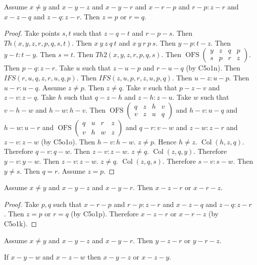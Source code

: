 \documentclass{article}
\newcommand{\Col}[3]{\operatorname{Col}(#1, #2, #3)}
\newcommand{\OFS}[8]{\operatorname{OFS}
\left(\begin{smallmatrix}%
#1 & #2 & #3 & #4 \\
#5 & #6 & #7 & #8
\end{smallmatrix}\right)%
}
\begin{document}
  \begin{forthel}
    \begin{lemma}[C5o1p]
      Assume $x \neq y$ and $x-y-z$ and $x-y-r$ and $x-r-p$ and $r-p : z-r$ and $x-z-q$ and $z-q : z-r$. Then $z = p$ or $r = q$.
    \end{lemma}
    \begin{proof}
    	Take points $s,t$ such that $z-q-t$ and $r-p-s$.
    	Then $Th(x,y,z,r,p,q,s,t)$.
    	Then $x~y~z~q~t$ and $x~y~r~p~s$.
    	Then $y-p : t-z$.
    	Then $y-t : t-y$.
    	Then $s = t$.
    	Then $Th2(x,y,z,r,p,q,s)$.
    	Then $\OFS{y}{z}{q}{p}{s}{p}{r}{z}$.
    	Then $p-q : z-r$.
    	Take $u$ such that $z-u-p$ and $r-u-q$ (by C5o1n).
    	Then $IFS(r,u,q,z,r,u,q,p)$.
    	Then $IFS(z,u,p,r,z,u,p,q)$.
    	Then $u-z : u-p$.
    	Then $u-r : u-q$.
    	Assume $z \neq p$. Then $z \neq q$.
    		Take $v$ such that $p-z-v$ and $z-v : z-q$.
    		Take $h$ such that $q-z-h$ and $z-h : z-u$.
    		Take $w$ such that $v-h-w$ and $h-w : h-v$.
        Then $\OFS{q}{z}{h}{v}{v}{z}{u}{q}$
        and $h-v : u-q$ and $h-w : u-r$
        and $\OFS{q}{u}{r}{z}{v}{h}{w}{z}$
        and $q-r : v-w$ and $z-w : z-r$ and $z-v : z-w$ (by C5o1o).
    		Then $h-v : h-w$. $z \neq p$. Hence $h \neq z$. $\Col{h}{z}{q}$. Therefore $q-v : q-w$.
    		Then $z-v : z-w$. $z \neq q$. $\Col{z}{q}{y}$. Therefore $y-v : y-w$.
    		Then $z-v : z-w$. $z \neq q$. $\Col{z}{q}{s}$. Therefore $s-v : s-w$.
    		Then $y \neq s$.
    		Then $q = r$.
    	Assume $z = p$.
    \end{proof}

    \begin{lemma}[D5o1]
      Assume $x \neq y$ and $x-y-z$ and $x-y-r$. Then $x-z-r$ or $x-r-z$.
    \end{lemma}
    \begin{proof}
    	Take $p,q$ such that $x-r-p$ and $r-p : z-r$ and $x-z-q$ and $z-q : z-r$. Then $z = p$ or $r = q$ (by C5o1p). Therefore $x-z-r$ or $x-r-z$ (by C5o1k).
    \end{proof}

    \begin{lemma}[D5o2]
      Assume $x \neq y$ and $x-y-z$ and $x-y-r$. Then $y-z-r$ or $y-r-z$.
    \end{lemma}

    \begin{theorem}[D5o3]
      If $x-y-w$ and $x-z-w$ then $x-y-z$ or $x-z-y$.
    \end{theorem}
  \end{forthel}
\end{document}
